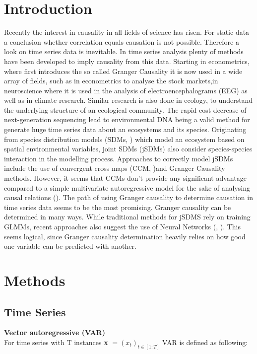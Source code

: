 \documentclass[a4paper]{report}
\begin{document}
	\chapter{Introduction}
	Recently the interest in causality in all fields of science has risen. For static data a conclusion whether correlation equals causation is not possible. Therefore a look on time series data is inevitable. In time series analysis plenty of methods have been developed to imply causality from this data. Starting in econometrics, where \cite{Granger.1969} first introduces the so called Granger Causality it is now used in a wide array of fields, such as in econometrics to analyse the stock markets,in neuroscience where it is used in the analysis of electroencephalograms (EEG) as well as in climate research. Similar research is also done in ecology, to understand the underlying structure of an ecological community. The rapid cost decrease of next-generation sequencing lead to environmental DNA being a valid method for generate huge time series data about an ecosystems and its species. 
	Originating from species distribution models (SDMs, ) which model an ecosystem based on spatial environmental variables, joint SDMs (jSDMs) also consider species-species interaction in the modelling process. 
	Approaches to correctly model jSDMs include the use of convergent cross maps (CCM, \cite{Sugihara.2012})and Granger Causality methods. However, it seems that CCMs don't provide any significant advantage compared to a simple multivariate autoregressive model for the sake of analysing causal relations (\cite{Barraquand.2021}). The path of using Granger causality to determine causation in time series data seems to be the most promising. Granger causality can be determined in many ways. While traditional methods for jSDMS rely on training GLMMs, recent approaches also suggest the use of Neural Networks (\cite{Montalto.2015}, \cite{Tank.2021}). This seems logical, since Granger causality determination heavily relies on how good one variable can be predicted with another.
	
	
	\chapter{Methods}
	
	\section{Time Series}
	\textbf{Vector autoregressive (VAR)}\\
	For time series with T instances \textbf{x} $ = (x_t)_{t\in [1:T]}$ VAR is defined as following:
	
\end{document}
